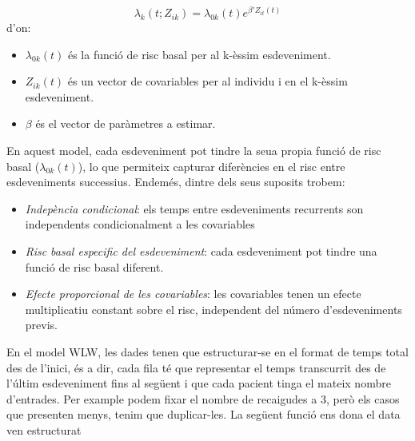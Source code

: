 \documentclass[
]{article}
\providecommand{\tightlist}{%
  \setlength{\itemsep}{0pt}\setlength{\parskip}{0pt}}
\begin{document}
\[
\lambda_k(t;Z_{ik}) = \lambda_{0k}(t) e^{\beta'Z_{it}(t)}
\] d'on:

\begin{itemize}
\tightlist
\item
  \(\lambda_{0k}(t)\) és la funció de risc basal per al k-èssim
  esdeveniment.
\item
  \(Z_{ik}(t)\) és un vector de covariables per al individu i en el
  k-èssim esdeveniment.
\item
  \(\beta\) és el vector de paràmetres a estimar.
\end{itemize}

En aquest model, cada esdeveniment pot tindre la seua propia funció de
risc basal (\(\lambda_{0k}(t)\)), lo que permiteix capturar diferències
en el risc entre esdeveniments successius. Endemés, dintre dels seus
suposits trobem:

\begin{itemize}
\item
  \emph{Indepència condicional}: els temps entre esdeveniments
  recurrents son independents condicionalment a les covariables
\item
  \emph{Risc basal especific del esdeveniment}: cada esdeveniment pot
  tindre una funció de risc basal diferent.
\item
  \emph{Efecte proporcional de les covariables}: les covariables tenen
  un efecte multiplicatiu constant sobre el risc, independent del número
  d'esdeveniments previs.
\end{itemize}

En el model WLW, les dades tenen que estructurar-se en el format de
temps total des de l'inici, és a dir, cada fila té que representar el
temps transcurrit des de l'últim esdeveniment fins al següent i que cada
pacient tinga el mateix nombre d'entrades. Per example podem fixar el
nombre de recaigudes a 3, però els casos que presenten menys, tenim que
duplicar-les. La següent funció ens dona el data ven estructurat
\end{document}

